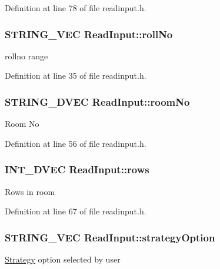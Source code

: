 Definition at line 78 of file readinput.\-h.

\hypertarget{classReadInput_a862fbffdffa56fc6d66b1d1f14dae087}{
\subsubsection[{roll\-No}]{\setlength{\rightskip}{0pt plus 5cm}S\-T\-R\-I\-N\-G\-\_\-\-V\-E\-C Read\-Input\-::roll\-No\hspace{0.3cm}{\ttfamily [protected]}}}\label{classReadInput_a862fbffdffa56fc6d66b1d1f14dae087}
rollno range 

Definition at line 35 of file readinput.\-h.

\hypertarget{classReadInput_a77f996670554c8a752e7cbd713ecb084}{
\subsubsection[{room\-No}]{\setlength{\rightskip}{0pt plus 5cm}S\-T\-R\-I\-N\-G\-\_\-D\-V\-E\-C Read\-Input\-::room\-No\hspace{0.3cm}{\ttfamily [protected]}}}\label{classReadInput_a77f996670554c8a752e7cbd713ecb084}
Room No 

Definition at line 56 of file readinput.\-h.

\hypertarget{classReadInput_ac853c80a2fad7a58fecde30db9fc93df}{
\subsubsection[{rows}]{\setlength{\rightskip}{0pt plus 5cm}I\-N\-T\-\_\-D\-V\-E\-C Read\-Input\-::rows\hspace{0.3cm}{\ttfamily [protected]}}}\label{classReadInput_ac853c80a2fad7a58fecde30db9fc93df}
Rows in room 

Definition at line 67 of file readinput.\-h.

\hypertarget{classReadInput_a0f62d76d15b123767751a22f87dc79ed}{
\subsubsection[{strategy\-Option}]{\setlength{\rightskip}{0pt plus 5cm}S\-T\-R\-I\-N\-G\-\_\-\-V\-E\-C Read\-Input\-::strategy\-Option\hspace{0.3cm}{\ttfamily [protected]}}}\label{classReadInput_a0f62d76d15b123767751a22f87dc79ed}
\hyperlink{classStrategy}{Strategy} option selected by user 

